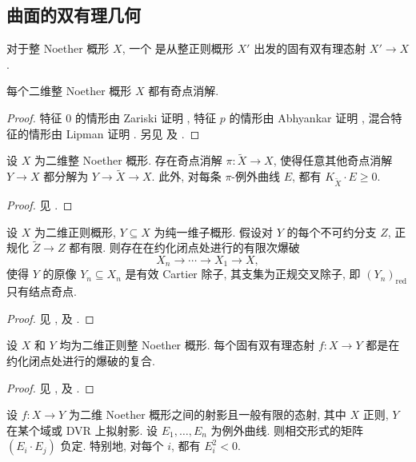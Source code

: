 \subsection{曲面的双有理几何}\label{src:B.2.1-subsection}
对于整 Noether 概形 $X$, 一个 是从整正则概形 $X'$ 出发的固有双有理态射 $X'\to X$.
\begin{theorem}[消解的存在性]\label{src:B.2.1}
每个二维整 Noether 概形 $X$ 都有奇点消解.
\end{theorem}
\begin{proof}
特征 $0$ 的情形由 Zariski 证明 \cite{Zar39}, 特征 $p$ 的情形由 Abhyankar 证明 \cite{Abh56}, 混合特征的情形由 Lipman 证明 \cite{Lip78}. 另见 \cite[\S$2$]{Kol07} 及 \cite[Tag 0BGP]{SP}.
\end{proof}
\begin{theorem}[极小消解的存在性]\label{src:B.2.2}
设 $X$ 为二维整 Noether 概形. 存在奇点消解 $\pi:\widetilde X\to X$, 使得任意其他奇点消解 $Y\to X$ 都分解为 $Y\to\widetilde X\to X$. 此外, 对每条 $\pi$-例外曲线 $E$, 都有 $K_{\widetilde X}\cdot E\geq0$.
\end{theorem}
\begin{proof}
见 \cite[定理 $2.16$]{Kol07}.
\end{proof}
\begin{theorem}[嵌入消解的存在性]\label{src:B.2.3}
设 $X$ 为二维正则概形, $Y\subseteq X$ 为纯一维子概形. 假设对 $Y$ 的每个不可约分支 $Z$, 正规化 $\widetilde Z\to Z$ 都有限. 则存在在约化闭点处进行的有限次爆破
\[
X_n\longrightarrow\cdots\longrightarrow X_1\longrightarrow X,
\]
使得 $Y$ 的原像 $Y_n\subseteq X_n$ 是有效 Cartier 除子, 其支集为正规交叉除子, 即 $(Y_n)_{\mathrm{red}}$ 只有结点奇点.
\end{theorem}
\begin{proof}
见 \cite[定理 V.$3.9$]{Har77}, \cite[定理 $1.47$]{Kol07} 及 \cite[Tag 0BIC]{SP}.
\end{proof}
\begin{theorem}[双有理映射的分解]\label{src:B.2.4}
设 $X$ 和 $Y$ 均为二维正则整 Noether 概形. 每个固有双有理态射 $f:X\to Y$ 都是在约化闭点处进行的爆破的复合.
\end{theorem}
\begin{proof}
见 \cite[定理 V.$5.5$]{Har77}, \cite[定理 $2.13$]{Kol07} 及 \cite[Tag 0C5R]{SP}.
\end{proof}
\begin{theorem}\label{src:B.2.5}
设 $f:X\to Y$ 为二维 Noether 概形之间的射影且一般有限的态射, 其中 $X$ 正则, $Y$ 在某个域或 DVR 上拟射影. 设 $E_1,\ldots,E_n$ 为例外曲线. 则相交形式的矩阵 $(E_i\cdot E_j)$ 负定. 特别地, 对每个 $i$, 都有 $E_i^2<0$.
\end{theorem}
